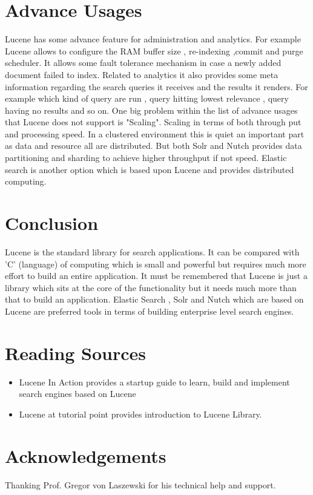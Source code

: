 \documentclass[9pt,twocolumn,twoside]{styles/osajnl}
\begin{document}
\section{Advance Usages}
Lucene has some advance feature for administration and analytics. For example Lucene allows to configure the RAM buffer size , re-indexing ,commit and purge scheduler. It allows some fault tolerance mechanism in case a newly added document failed to index. Related to analytics it also provides some meta information regarding the search queries it receives and the results it renders. For example which kind of query are run , query hitting lowest relevance , query having no results and so on. One big problem within the list of advance usages that Lucene does not support is "Scaling". Scaling in terms of both through put and processing speed. In a clustered environment this is quiet an important part as data and resource all are distributed. But both Solr and Nutch provides data partitioning and sharding to achieve higher throughput if not speed. Elastic search is another option which is based upon Lucene and provides distributed computing.


\section{Conclusion}
Lucene is the standard library for search applications. It can be compared with 'C' (language) of computing which is small and powerful but requires much more effort to build an entire application. It must be remembered that Lucene is just a library which sits at the core of the functionality but it needs much more than that to build an application. Elastic Search , Solr and Nutch which are based on Lucene are preferred tools in terms of building enterprise level search engines. 

\section{Reading Sources}

\begin{itemize}
\item Lucene In Action \cite{lucene-book} provides a startup guide to
learn, build and implement search engines based on Lucene 
\item Lucene at tutorial point \cite{www-lucene-tp} provides introduction
 to Lucene Library.
\end{itemize}



\section*{Acknowledgements}

Thanking Prof. Gregor von Laszewski for his technical help and support.




\end{document}
